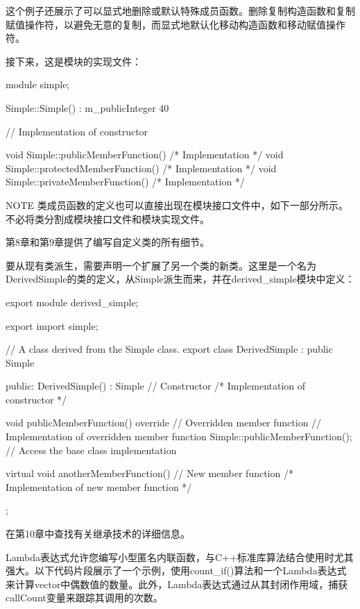 这个例子还展示了可以显式地删除或默认特殊成员函数。删除复制构造函数和复制赋值操作符，以避免无意的复制，而显式地默认化移动构造函数和移动赋值操作符。

接下来，这是模块的实现文件：

\begin{cpp}
module simple;

Simple::Simple() : m_publicInteger { 40 }

{
    // Implementation of constructor
}

void Simple::publicMemberFunction() { /* Implementation */ }
void Simple::protectedMemberFunction() { /* Implementation */ }
void Simple::privateMemberFunction() { /* Implementation */ }
\end{cpp}

\begin{myNotic}{NOTE}
类成员函数的定义也可以直接出现在模块接口文件中，如下一部分所示。不必将类分割成模块接口文件和模块实现文件。
\end{myNotic}

第8章和第9章提供了编写自定义类的所有细节。


要从现有类派生，需要声明一个扩展了另一个类的新类。这里是一个名为DerivedSimple的类的定义，从Simple派生而来，并在derived\_simple模块中定义：

\begin{cpp}
export module derived_simple;

export import simple;

// A class derived from the Simple class.
export class DerivedSimple : public Simple
{
    public:
        DerivedSimple() : Simple{} // Constructor
        { /* Implementation of constructor */ }

        void publicMemberFunction() override // Overridden member function
        {
            // Implementation of overridden member function
            Simple::publicMemberFunction(); // Access the base class implementation
        }

        virtual void anotherMemberFunction() // New member function
        { /* Implementation of new member function */ }
};
\end{cpp}

在第10章中查找有关继承技术的详细信息。


Lambda表达式允许您编写小型匿名内联函数，与C++标准库算法结合使用时尤其强大。以下代码片段展示了一个示例，使用count\_if()算法和一个Lambda表达式来计算vector中偶数值的数量。此外，Lambda表达式通过从其封闭作用域，捕获callCount变量来跟踪其调用的次数。

